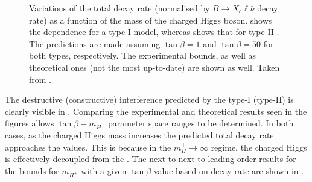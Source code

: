 \begin{figure}[htbp!]
    \centering
    \caption{\label{fig:xsgamma_br_2hdm} 
    Variations of the \BtoXsgamma total decay rate (normalised by $B\rightarrow X_c \ell\bar{\nu}$ decay rate) as a function of the mass of the charged Higgs boson.
     shows the dependence for a type-I \TwoHDM model, whereas  shows that for type-II \TwoHDM.
    The predictions are made assuming $\tan\beta=1$ and $\tan\beta=50$ for both types, respectively.
    The experimental bounds, as well as theoretical ones (not the most up-to-date) are shown as well.
    Taken from \cite{Misiak:2017bgg}.}
\end{figure}


The destructive (constructive) interference predicted by the type-I (type-II)  is clearly visible in .
Comparing the experimental and theoretical results seen in the figures allows $\tan\beta-m_{H^+}$ parameter space ranges to be determined.
In both cases, as the charged Higgs mass increases the predicted total decay rate approaches the \SM values.
This is because in the $m_H^+\rightarrow\infty$ regime, the charged Higgs is effectively decoupled from the \SM.
The next-to-next-to-leading order results for the bounds for $m_{H^+}$ with a given $\tan\beta$ value based on \BtoXsgamma decay rate are shown in .

